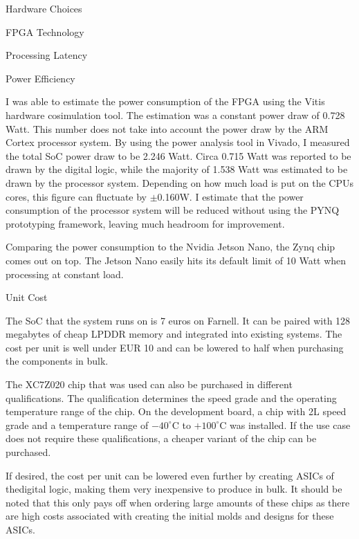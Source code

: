 \documentclass{matthijs}
\begin{document}
\begin{hoofdstuk}{Hardware Choices}
\begin{paragraaf}{FPGA Technology}
\begin{subparagraaf}{Processing Latency}
			\end{subparagraaf}

			\begin{subparagraaf}{Power Efficiency}

				I was able to estimate the power consumption of the FPGA using the Vitis hardware cosimulation tool.
				The estimation was a constant power draw of 0.728 Watt.
				This number does not take into account the power draw by the ARM Cortex processor system.
				By using the power analysis tool in Vivado, I measured the total SoC power draw to be 2.246 Watt.
				Circa 0.715 Watt was reported to be drawn by the digital logic, while the majority of 1.538 Watt was estimated to be drawn by the processor system.
				Depending on how much load is put on the CPUs cores, this figure can fluctuate by $\pm$0.160W.
				I estimate that the power consumption of the processor system will be reduced without using the PYNQ prototyping framework, leaving much headroom for improvement.

				\bigskip

				Comparing the power consumption to the Nvidia Jetson Nano, the Zynq chip comes out on top.
				The Jetson Nano easily hits its default limit of 10 Watt when processing at constant load.

			\end{subparagraaf}

			\begin{subparagraaf}{Unit Cost}

				The SoC that the system runs on is 7 euros on Farnell.
				It can be paired with 128 megabytes of cheap LPDDR memory and integrated into existing systems.
				The cost per unit is well under EUR 10 and can be lowered to half when purchasing the components in bulk.

				\bigskip

				The XC7Z020 chip that was used can also be purchased in different qualifications.
				The qualification determines the speed grade and the operating temperature range of the chip.
				On the development board, a chip with 2L speed grade and a temperature range of $-40^\circ$C to $+100^\circ$C was installed.
				If the use case does not require these qualifications, a cheaper variant of the chip can be purchased.

				\bigskip

				If desired, the cost per unit can be lowered even further by creating ASICs of thedigital logic, making them very inexpensive to produce in bulk.
				It should be noted that this only pays off when ordering large amounts of these chips as there are high costs associated with creating the initial molds and designs for these ASICs.


\end{subparagraaf}
\end{paragraaf}
\end{hoofdstuk}
\end{document}
